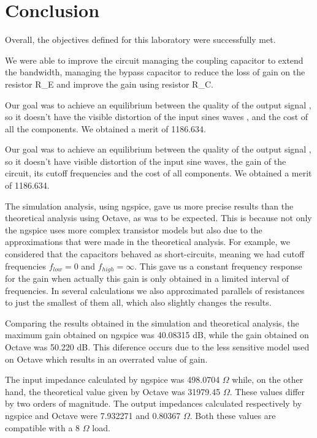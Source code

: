 \section{Conclusion}
\label{sec:conclusion}


Overall, the objectives defined for this laboratory were successfully met.

We were able to improve the circuit managing the coupling capacitor to extend the bandwidth, managing the bypass capacitor to reduce the loss of gain on the resistor R_E and improve the gain using resistor R_C.


Our goal was to achieve an equilibrium between the quality of the output signal , so it doesn't have the visible distortion of the input sines waves , and the cost of all the components. We obtained a merit of 1186.634.

Our goal was to achieve an equilibrium between the quality of the output signal , so it doesn't have visible distortion of the input sine waves, the gain of the circuit, its cutoff frequencies and the cost of all components. We obtained a merit of 1186.634.

The simulation analysis, using ngspice, gave us more precise results than the theoretical analysis using Octave, as was to be expected. This is because not only the ngspice uses more complex transistor models but also due to the approximations that were made in the theoretical analysis. For example, we considered that the capacitors behaved as short-circuits, meaning we had cutoff frequencies $f_{low}=0$ and $f_{high}= \infty$. This gave us a constant frequency response for the gain when actually this gain is only obtained in a limited interval of frequencies.  In several calculations we also approximated parallels of resistances to just the smallest of them all, which also slightly changes the results.

Comparing the results obtained in the simulation and theoretical analysis, the maximum gain obtained on ngspice was 40.08315 dB, while the gain obtained on Octave was 50.220 dB. This diference occurs due to the less sensitive model used on Octave which results in an overrated value of gain. 

The input impedance calculated by ngspice was 498.0704 $\Omega$ while, on the other hand, the theoretical value  given by Octave was 31979.45 $\Omega$. These values differ by two orders of magnitude. The output impedances calculated respectively by ngspice and Octave were 7.932271 and 0.80367 $\Omega$. Both these values are compatible with a 8 $\Omega$ load. 



